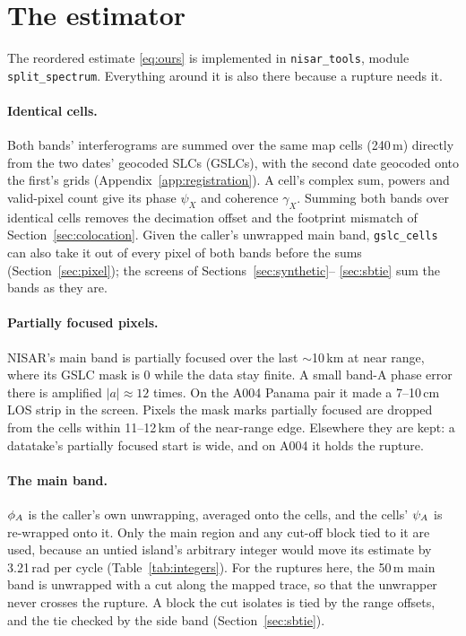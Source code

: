 \section{The estimator}
\label{sec:estimator}

The reordered estimate \eqref{eq:ours} is implemented in \texttt{nisar\_tools}, module \texttt{split\_spectrum}.
Everything around it is also there because a rupture needs it.

\paragraph{Identical cells.} Both bands' interferograms are summed over the same map cells (240\,m) directly from
the two dates' geocoded SLCs (GSLCs), with the second date geocoded onto the first's grids
(Appendix~\ref{app:registration}). A cell's complex sum, powers and valid-pixel count give its phase $\psi_X$ and
coherence $\gamma_X$. Summing both bands over identical cells removes the decimation offset and the footprint mismatch
of Section~\ref{sec:colocation}. Given the caller's unwrapped main band, \texttt{gslc\_cells} can also take it out of
every pixel of both bands before the sums (Section~\ref{sec:pixel}); the screens of Sections~\ref{sec:synthetic}--
\ref{sec:sbtie} sum the bands as they are.

\paragraph{Partially focused pixels.} NISAR's main band is partially focused over the last $\sim$10\,km at near
range, where its GSLC mask is 0 while the data stay finite. A small band-A phase error there is amplified
$|a|\approx 12$ times. On the A004 Panama pair it made a 7--10\,cm LOS strip in the screen. Pixels the mask marks
partially focused are dropped from the cells within 11--12\,km of the near-range edge. Elsewhere they are kept: a
datatake's partially focused start is wide, and on A004 it holds the rupture.

\paragraph{The main band.} $\phi_A$ is the caller's own unwrapping, averaged onto the cells, and the cells' $\psi_A$ is
re-wrapped onto it. Only the main region and any cut-off block tied to it are used, because an untied island's
arbitrary integer would move its estimate by 3.21\,rad per cycle (Table~\ref{tab:integers}). For the ruptures here,
the 50\,m main band is unwrapped with a cut along the mapped trace, so that the unwrapper never crosses the rupture.
A block the cut isolates is tied by the range offsets, and the tie checked by the side band (Section~\ref{sec:sbtie}).

